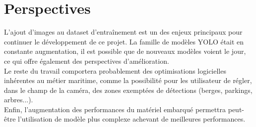 \chapter{Perspectives}

L'ajout d'images au dataset d'entraînement est un des enjeux principaux 
pour continuer le développement de ce projet. 
La famille de modèles YOLO était en constante augmentation, 
il est possible que de nouveaux modèles voient le jour, 
ce qui offre également des perspectives d'amélioration. \\

Le reste du travail comportera probablement des optimisations 
logicielles inhérentes au métier maritime, comme la possibilité 
pour les utilisateur de régler, dans le champ de la caméra,
des zones exemptées de détections (berges, parkings, arbres...). \\

Enfin, l'augmentation des performances du matériel embarqué 
permettra peut-être l'utilisation de modèle plus complexe 
achevant de meilleures performances. \\